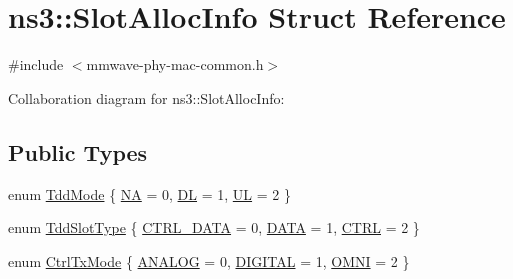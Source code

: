 \hypertarget{structns3_1_1SlotAllocInfo}{}\section{ns3\+:\+:Slot\+Alloc\+Info Struct Reference}
\label{structns3_1_1SlotAllocInfo}


{\ttfamily \#include $<$mmwave-\/phy-\/mac-\/common.\+h$>$}



Collaboration diagram for ns3\+:\+:Slot\+Alloc\+Info\+:
\subsection*{Public Types}
\begin{DoxyCompactItemize}
\item 
enum \hyperlink{structns3_1_1SlotAllocInfo_a6cad60db1d39034f1851e2cea625fe5d}{Tdd\+Mode} \{ \hyperlink{structns3_1_1SlotAllocInfo_a6cad60db1d39034f1851e2cea625fe5da0d73824eefc581199f1d80dca578ee93}{NA} = 0, 
\hyperlink{structns3_1_1SlotAllocInfo_a6cad60db1d39034f1851e2cea625fe5da9a365c9c56b7c32dcae38ee1a468ce6d}{DL} = 1, 
\hyperlink{structns3_1_1SlotAllocInfo_a6cad60db1d39034f1851e2cea625fe5da916b5be54594ead6ed677c570311cad2}{UL} = 2
 \}
\item 
enum \hyperlink{structns3_1_1SlotAllocInfo_a3ea7cb503bfd0c9a4df55a71b81b9331}{Tdd\+Slot\+Type} \{ \hyperlink{structns3_1_1SlotAllocInfo_a3ea7cb503bfd0c9a4df55a71b81b9331a1ea636c3f068558fabacbc39934309b8}{C\+T\+R\+L\+\_\+\+D\+A\+TA} = 0, 
\hyperlink{structns3_1_1SlotAllocInfo_a3ea7cb503bfd0c9a4df55a71b81b9331aa31d6b9a2b8e91de428fe1054d19a2bb}{D\+A\+TA} = 1, 
\hyperlink{structns3_1_1SlotAllocInfo_a3ea7cb503bfd0c9a4df55a71b81b9331ad78b7d76ef82d56c33be1fa9c1867409}{C\+T\+RL} = 2
 \}
\item 
enum \hyperlink{structns3_1_1SlotAllocInfo_adcbd067d82be6260b3399167d8f0b4ec}{Ctrl\+Tx\+Mode} \{ \hyperlink{structns3_1_1SlotAllocInfo_adcbd067d82be6260b3399167d8f0b4ecafbb3aa38e32e09fe88905db8efaf2965}{A\+N\+A\+L\+OG} = 0, 
\hyperlink{structns3_1_1SlotAllocInfo_adcbd067d82be6260b3399167d8f0b4eca47a67c342db658a08ded9ce4b49417ea}{D\+I\+G\+I\+T\+AL} = 1, 
\hyperlink{structns3_1_1SlotAllocInfo_adcbd067d82be6260b3399167d8f0b4eca1e92ea2806029ce26d51b9b1439f92a2}{O\+M\+NI} = 2
 \}
\end{DoxyCompactItemize}
